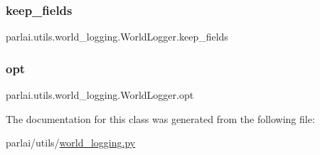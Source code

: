 \subsubsection{\texorpdfstring{keep\+\_\+fields}{keep\_fields}}
{\footnotesize\ttfamily parlai.\+utils.\+world\+\_\+logging.\+World\+Logger.\+keep\+\_\+fields}

\mbox{\label{classparlai_1_1utils_1_1world__logging_1_1WorldLogger_aaf2ae02c76953a68916b5136c1d2cc31}} 
\subsubsection{\texorpdfstring{opt}{opt}}
{\footnotesize\ttfamily parlai.\+utils.\+world\+\_\+logging.\+World\+Logger.\+opt}



The documentation for this class was generated from the following file\+:\begin{DoxyCompactItemize}
\item 
parlai/utils/\hyperlink{world__logging_8py}{world\+\_\+logging.\+py}\end{DoxyCompactItemize}
